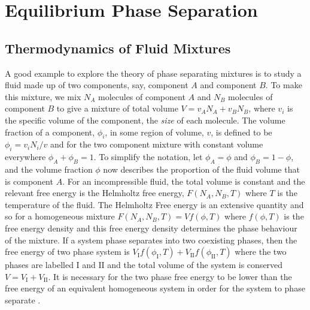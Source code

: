 \section{Equilibrium Phase Separation}

\subsection{Thermodynamics of Fluid Mixtures}

A good example to explore the theory of phase separating mixtures is to study a fluid made up of two components, say, component $A$ and component $B$. To make this mixture, we mix $N_A$ molecules of component $A$ and $N_B$ molecules of component $B$ to give a mixture of total volume $V = v_A N_A + v_B N_B$, where $v_i$ is the specific volume of the component, the \textit{size} of each molecule. The volume fraction of a component, $\phi_i$, in some region of volume, $v$, is defined to be $\phi_i = v_i N_i/v$ and for the two component mixture with constant volume everywhere $\phi_A+\phi_B = 1$. To simplify the notation, let $\phi_A=\phi$ and $\phi_B=1-\phi$, and the volume fraction $\phi$ now describes the proportion of the fluid volume that is component $A$. For an incompressible fluid, the total volume is constant and the relevant free energy is the Helmholtz free energy, $F(N_A, N_B, T)$ where $T$ is the temperature of the fluid. The Helmholtz Free energy is an extensive quantity and so for a homogeneous mixture $F(N_A, N_B, T) = V f(\phi, T)$ where $f(\phi, T)$ is the free energy density and this free energy density determines the phase behaviour of the mixture. If a system phase separates into two coexisting phases, then the free energy of two phase system is $V_{\mathrm{I}} f(\phi_{\mathrm{I}}, T)+ V_{\mathrm{II}} f(\phi_{\mathrm{II}}, T)$ where the two phases are labelled $\mathrm{I}$ and $\mathrm{II}$ and the total volume of the system is conserved $V = V_{\mathrm{I}}+V_{\mathrm{II}}$. It is necessary for the two phase free energy to be lower than the free energy of an equivalent homogeneous system in order for the system to phase separate \cite{jones2002soft}.

